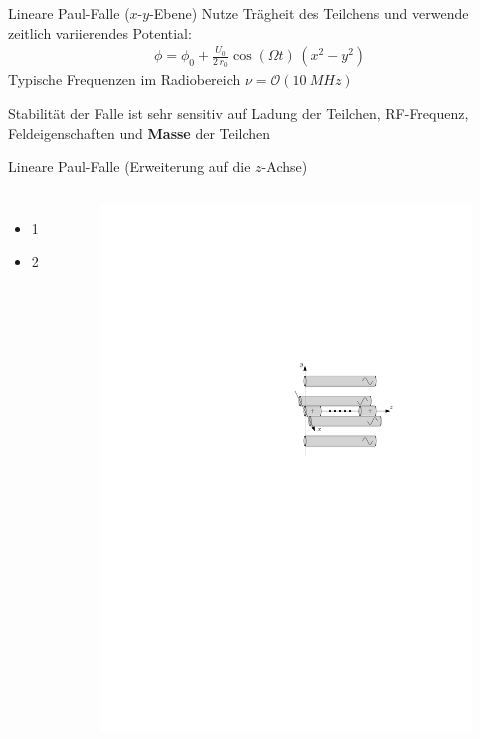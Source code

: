 \documentclass[12pt,xcolor=dvipsnames]{beamer}
\begin{document}
\begin{frame}{Lineare Paul-Falle ($x$-$y$-Ebene)}
	Nutze Trägheit des Teilchens und verwende zeitlich variierendes Potential:
	\begin{align}
		\phi = \phi_0 + \frac{U_0}{2 \, r_0} \cos(\Omega t) \, (x^2-y^2)
	\end{align}
	Typische Frequenzen im Radiobereich $\nu = \mathcal{O}(\SI{10}{MHz})$
	
	Stabilität der Falle ist sehr sensitiv auf Ladung der Teilchen, RF-Frequenz, Feldeigenschaften und \textbf{Masse} der Teilchen
\end{frame}

\begin{frame}{Lineare Paul-Falle (Erweiterung auf die $z$-Achse)}
	\begin{columns}[t]
		\begin{itemize}
			\item 1
			\item 2
		\end{itemize}
			\begin{figure}[h]
				\centering
				\includegraphics[width = 1\textwidth]{./figures/lineare_paulfalle.pdf}
			\end{figure}
	\end{columns}

\end{frame}
\end{document}
